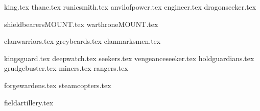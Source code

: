 
{king.tex}
{thane.tex}
{runicsmith.tex}
{anvilofpower.tex}
{engineer.tex}
{dragonseeker.tex}

\clearpage
{}
{shieldbearersMOUNT.tex}
{warthroneMOUNT.tex}

\clearpage
{}
{clanwarriors.tex}
{greybeards.tex}
{clanmarksmen.tex}


\clearpage
{}
{kingsguard.tex}
{deepwatch.tex}
{seekers.tex}
{vengeanceseeker.tex}
{holdguardians.tex}
{grudgebuster.tex}
{miners.tex}
{rangers.tex}

\clearpage
{}
{forgewardens.tex}
{steamcopters.tex}

\clearpage
{}
{fieldartillery.tex}
